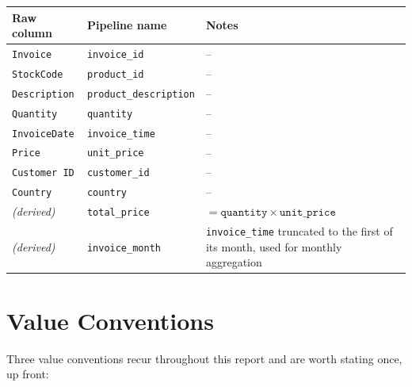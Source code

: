 \begin{center}
\begin{tabular}{@{}p{3cm}p{4cm}p{7.6cm}@{}}
    \toprule
    Raw column & Pipeline name & Notes \\
    \midrule
    \texttt{Invoice} & \texttt{invoice\_id} & -- \\
    \texttt{StockCode} & \texttt{product\_id} & -- \\
    \texttt{Description} & \texttt{product\_description} & -- \\
    \texttt{Quantity} & \texttt{quantity} & -- \\
    \texttt{InvoiceDate} & \texttt{invoice\_time} & -- \\
    \texttt{Price} & \texttt{unit\_price} & -- \\
    \texttt{Customer ID} & \texttt{customer\_id} & -- \\
    \texttt{Country} & \texttt{country} & -- \\
    \emph{(derived)} & \texttt{total\_price} & $= \texttt{quantity} \times \texttt{unit\_price}$ \\
    \emph{(derived)} & \texttt{invoice\_month} & \texttt{invoice\_time} truncated to the first of its month, used for monthly aggregation \\
    \bottomrule
\end{tabular}
\end{center}

\section{Value Conventions}
\label{sec:3-5}

Three value conventions recur throughout this report and are worth stating once, up front:

